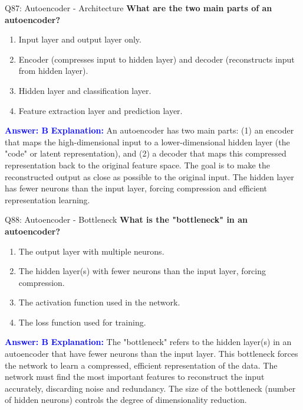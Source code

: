 \documentclass[8pt]{beamer}
\begin{document}
	\begin{frame}{Q87: Autoencoder - Architecture}
		\fontsize{6.5}{7.5}\selectfont
		\textbf{What are the two main parts of an autoencoder?}
		\begin{enumerate}
			\item Input layer and output layer only.
			\item Encoder (compresses input to hidden layer) and decoder (reconstructs input from hidden layer).
			\item Hidden layer and classification layer.
			\item Feature extraction layer and prediction layer.
		\end{enumerate}
		\vspace{0.1cm}
		\textcolor{blue}{\textbf{Answer: B}}
		\vspace{0.1cm}
		\textcolor{blue}{\textbf{Explanation:}} An autoencoder has two main parts: (1) an encoder that maps the high-dimensional input to a lower-dimensional hidden layer (the "code" or latent representation), and (2) a decoder that maps this compressed representation back to the original feature space. The goal is to make the reconstructed output as close as possible to the original input. The hidden layer has fewer neurons than the input layer, forcing compression and efficient representation learning.
	\end{frame}
	
	\begin{frame}{Q88: Autoencoder - Bottleneck}
		\fontsize{6.5}{7.5}\selectfont
		\textbf{What is the "bottleneck" in an autoencoder?}
		\begin{enumerate}
			\item The output layer with multiple neurons.
			\item The hidden layer(s) with fewer neurons than the input layer, forcing compression.
			\item The activation function used in the network.
			\item The loss function used for training.
		\end{enumerate}
		\vspace{0.1cm}
		\textcolor{blue}{\textbf{Answer: B}}
		\vspace{0.1cm}
		\textcolor{blue}{\textbf{Explanation:}} The "bottleneck" refers to the hidden layer(s) in an autoencoder that have fewer neurons than the input layer. This bottleneck forces the network to learn a compressed, efficient representation of the data. The network must find the most important features to reconstruct the input accurately, discarding noise and redundancy. The size of the bottleneck (number of hidden neurons) controls the degree of dimensionality reduction.
	\end{frame}
	
\end{document}
